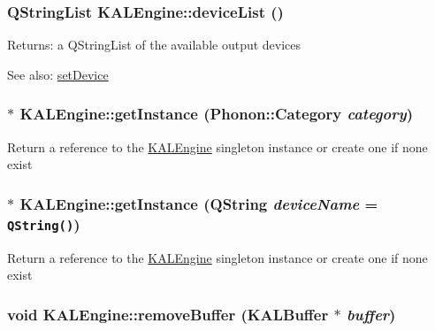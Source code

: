 \hypertarget{class_k_a_l_engine_9141fde32ddd7c6e7e9e2a0dc5d5375b}{
\subsubsection[{deviceList}]{\setlength{\rightskip}{0pt plus 5cm}QStringList KALEngine::deviceList ()}}
\label{class_k_a_l_engine_9141fde32ddd7c6e7e9e2a0dc5d5375b}


\begin{Desc}
\item[Returns:]a QStringList of the available output devices \end{Desc}
\begin{Desc}
\item[See also:]\hyperlink{class_k_a_l_engine_697ace280196c559fc54f9e4ad99945b}{setDevice} \end{Desc}
\hypertarget{class_k_a_l_engine_a9802c767f0efe5685b0cc8af742343d}{
\subsubsection[{getInstance}]{ $\ast$ KALEngine::getInstance (Phonon::Category {\em category})}}
\label{class_k_a_l_engine_a9802c767f0efe5685b0cc8af742343d}


Return a reference to the \hyperlink{class_k_a_l_engine}{KALEngine} singleton instance or create one if none exist \hypertarget{class_k_a_l_engine_6734e54cc206f432d55d5cc9e42a8f50}{
\subsubsection[{getInstance}]{ $\ast$ KALEngine::getInstance (QString {\em deviceName} = {\tt QString()})}}
\label{class_k_a_l_engine_6734e54cc206f432d55d5cc9e42a8f50}


Return a reference to the \hyperlink{class_k_a_l_engine}{KALEngine} singleton instance or create one if none exist \hypertarget{class_k_a_l_engine_6a5cc953f187197973e2c9e6235b2c27}{
\subsubsection[{removeBuffer}]{\setlength{\rightskip}{0pt plus 5cm}void KALEngine::removeBuffer ({\bf KALBuffer} $\ast$ {\em buffer})}}
\label{class_k_a_l_engine_6a5cc953f187197973e2c9e6235b2c27}



